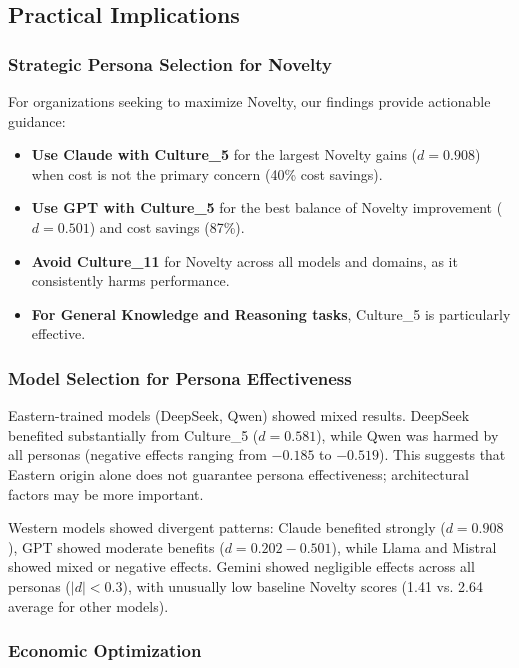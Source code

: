 \documentclass{article}
\begin{document}
\subsection{Practical Implications}

\subsubsection{Strategic Persona Selection for Novelty}

For organizations seeking to maximize Novelty, our findings provide actionable guidance:

\begin{itemize}
    \item \textbf{Use Claude with Culture\_5} for the largest Novelty gains (\(d = 0.908\)) when cost is not the primary concern (40\% cost savings).
    \item \textbf{Use GPT with Culture\_5} for the best balance of Novelty improvement (\(d = 0.501\)) and cost savings (87\%).
    \item \textbf{Avoid Culture\_11} for Novelty across all models and domains, as it consistently harms performance.
    \item \textbf{For General Knowledge and Reasoning tasks}, Culture\_5 is particularly effective.
\end{itemize}

\subsubsection{Model Selection for Persona Effectiveness}

Eastern-trained models (DeepSeek, Qwen) showed mixed results. DeepSeek benefited substantially from Culture\_5 (\(d = 0.581\)), while Qwen was harmed by all personas (negative effects ranging from \(-0.185\) to \(-0.519\)). This suggests that Eastern origin alone does not guarantee persona effectiveness; architectural factors may be more important.

Western models showed divergent patterns: Claude benefited strongly (\(d = 0.908\)), GPT showed moderate benefits (\(d = 0.202-0.501\)), while Llama and Mistral showed mixed or negative effects. Gemini showed negligible effects across all personas (\(|d| < 0.3\)), with unusually low baseline Novelty scores (1.41 vs. 2.64 average for other models).

\subsubsection{Economic Optimization}
\end{document}
